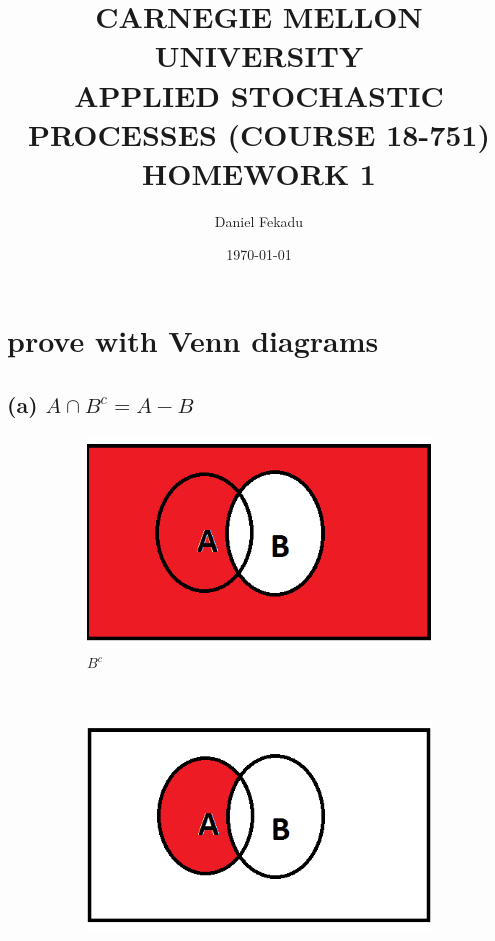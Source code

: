 \documentclass[a4paper,11pt]{article}
\begin{document}
\title{\color{red}CARNEGIE MELLON UNIVERSITY\\
APPLIED STOCHASTIC PROCESSES  (COURSE 18-751)\\
HOMEWORK 1}
\author{Daniel Fekadu}
\date{\today}
\maketitle
\newpage
\section{prove with Venn diagrams}
\subsection*{(a) $A \cap B^c = A-B$}
\begin{figure}[h]
    \centering
    \begin{subfigure}[b]{0.25\textwidth}
        \includegraphics[width=\textwidth]{BC}
        \caption{$B^c$}
    \end{subfigure}
 ~
    \begin{subfigure}[b]{0.25\textwidth}
        \includegraphics[width=\textwidth]{AnBc}

\end{subfigure}
\end{figure}
\end{document}
